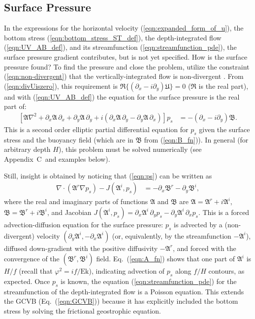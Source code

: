 \documentclass{ametsocV6.2}
\newcommand{\appnumSoln}{Appendix~C}
\begin{document}
\subsection{Surface Pressure}
\label{sect:PG_closure}

In the expressions for the horizontal velocity (\ref{eqn:expanded_form_of_u}), the bottom stress (\ref{eqn:bottom_stress_ST_def}), the depth-integrated flow (\ref{eqn:UV_AB_def}), and its streamfunction (\ref{eqn:streamfunction_pde}), the surface pressure gradient contributes, but is not yet specified. 
How is the surface pressure found?
To find the pressure and close the problem, utilize the constraint (\ref{eqn:non-divergent}) that the vertically-integrated flow is non-divergent \citep{salmon98}.
From (\ref{eqn:divUiszero}), this requirement is $\Re \{ (\partial_x - i \partial_y) \mathfrak{U} \} = 0$ ($\Re$ is the real part), and with (\ref{eqn:UV_AB_def}) the equation for the surface pressure is the real part of:
\begin{align}
\left[ \mathfrak{A} \nabla^2 + 
\partial_x \mathfrak{A} \, \partial_x +  \partial_y \mathfrak{A} \, \partial_y  +
i \left(  \partial_x \mathfrak{A} \, \partial_y  - \partial_y \mathfrak{A} \, \partial_x \right) \right] p_s
 & =-  \left(
\partial_x - i \partial_y
\right) \mathfrak{B}  .
\label{eqn:ps}
\end{align}
This is a second order elliptic partial differential equation for $p_s$ given the surface stress and the buoyancy field (which are in $\mathfrak{B}$ from (\ref{eqn:B_fn})).
In general (for arbitrary depth $H$), this problem must be solved numerically (see \appnumSoln\ and examples below). 

Still, insight is obtained by noticing that (\ref{eqn:ps}) can be written as
\begin{align}
\nabla \cdot \left( \mathfrak{A}^r \nabla p_s \right) - J \left( \mathfrak{A}^i , p_s \right) & = -  \partial_x \mathfrak{B}^r  -  \partial_y \mathfrak{B}^i ,
\label{eqn:p_s_advection_diffusion}
\end{align}
where the real and imaginary parts of functions $\mathfrak{A}$ and $\mathfrak{B}$ are $\mathfrak{A} = \mathfrak{A}^r + i \mathfrak{A}^i$, $\mathfrak{B} = \mathfrak{B}^r + i \mathfrak{B}^i$, and Jacobian $J(\mathfrak{A}^i, p_s) = \partial_x \mathfrak{A}^i \, \partial_y p_s - \partial_y \mathfrak{A}^i \, \partial_x p_s$.
This is a forced advection-diffusion equation for the surface pressure: $p_s$ is advected by a (non-divergent) velocity $(\partial_y \mathfrak{A}^i, -\partial_x \mathfrak{A}^i)$ (or, equivalently, by the streamfunction $-\mathfrak{A}^i$), diffused down-gradient with the positive diffusivity $-\mathfrak{A}^r$, and forced with the convergence of the $(\mathfrak{B}^r, \mathfrak{B}^i)$ field.
Eq.~(\ref{eqn:A_fn}) shows that one part of $\mathfrak{A}^i$ is $H /f$ (recall that $\varphi^2 = i f / \mathrm{Ek}$), indicating advection of $p_s$ along $f/H$ contours, as expected.
Once $p_s$ is known, the equation (\ref{eqn:streamfunction_pde}) for the streamfunction of the depth-integrated flow is a Poisson equation.
This extends the GCVB (Eq.~(\ref{eqn:GCVB})) because it has explicitly included the bottom stress by solving the frictional geostrophic equation.
\end{document}
